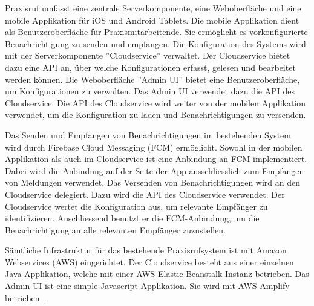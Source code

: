 Praxisruf umfasst eine zentrale Serverkomponente, eine Weboberfläche und eine mobile Applikation für iOS und Android Tablets.
Die mobile Applikation dient als Benutzeroberfläche für Praxismitarbeitende.
Sie ermöglicht es vorkonfigurierte Benachrichtigung zu senden und empfangen.
Die Konfiguration des Systems wird mit der Serverkomponente ''Cloudservice'' verwaltet.
Der Cloudservice bietet dazu eine API an, über welche Konfigurationen erfasst, gelesen und bearbeitet werden können.
Die Weboberfläche ''Admin UI'' bietet eine Benutzeroberfläche, um Konfigurationen zu verwalten.
Das Admin UI verwendet dazu die API des Cloudservice.
Die API des Cloudservice wird weiter von der mobilen Applikation verwendet, um die Konfiguration zu laden und Benachrichtigungen zu versenden.

Das Senden und Empfangen von Benachrichtigungen im bestehenden System wird durch Firebase Cloud Messaging (FCM) ermöglicht.
Sowohl in der mobilen Applikation als auch im Cloudservice ist eine Anbindung an FCM implementiert.
Dabei wird die Anbindung auf der Seite der App ausschliesslich zum Empfangen von Meldungen verwendet.
Das Versenden von Benachrichtigungen wird an den Cloudservice delegiert.
Dazu wird die API des Cloudservice verwendet.
Der Cloudservice wertet die Konfiguration aus, um relevante Empfänger zu identifizieren.
Anschliessend benutzt er die FCM-Anbindung, um die Benachrichtigung an alle relevanten Empfänger zuzustellen.

Sämtliche Infrastruktur für das bestehende Praxisrufsystem ist mit Amazon Webservices (AWS) eingerichtet.
Der Cloudservice besteht aus einer einzelnen Java-Applikation, welche mit einer AWS Elastic Beanstalk Instanz betrieben.
Das Admin UI ist eine simple Javascript Applikation.
Sie wird mit AWS Amplify betrieben~\cite{ip5}.

